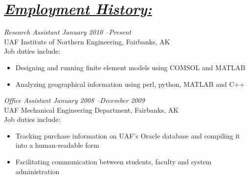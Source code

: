 \documentclass[10pt, letterpaper]{article}
\begin{document}


\section*{\underline{\textit{Employment History:}}}

\large\textit{Research Assistant \hfill January 2010 --Present}\normalsize \\
UAF Institute of Northern Engineering, Fairbanks, AK\\
Job duties include:
\small\begin{itemize}
\item Designing and running finite element models using COMSOL and MATLAB
\item Analyzing geographical information using perl, python, MATLAB and C++
\end{itemize}\normalsize\medskip

\large\textit{Office Assistant \hfill January 2008 --December 2009}\normalsize \\
UAF Mechanical Engineering Department, Fairbanks, AK\\
Job duties include:
\small\begin{itemize}
\item Tracking purchase information on UAF's Oracle database and compiling it
into a human-readable form
\item Facilitating communication between students, faculty and system
administration
\end{itemize}\normalsize\medskip
\end{document}
